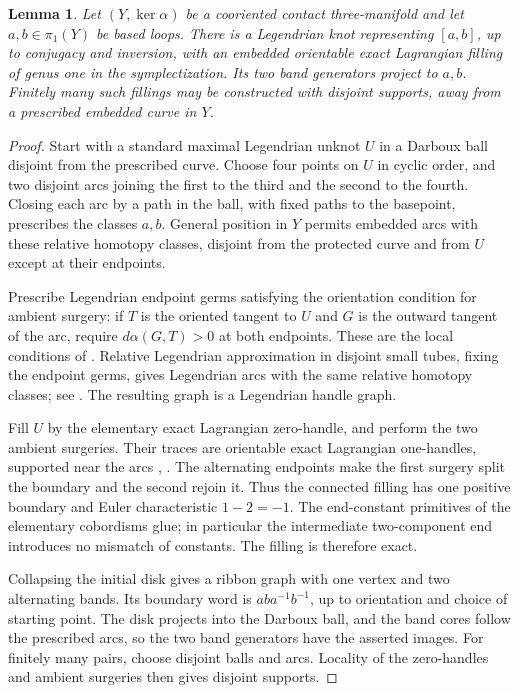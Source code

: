 \documentclass[11pt]{amsart}
\newtheorem{lemma}[theorem]{Lemma}
\theoremstyle{definition}
\theoremstyle{remark}
\begin{document}
\begin{lemma}\label{lem:commutator-filling}
Let $(Y,\ker\alpha)$ be a cooriented contact three-manifold and
let $a,b\in\pi_1(Y)$ be based loops. There is a Legendrian knot
representing $[a,b]$, up to conjugacy and inversion, with an embedded
orientable exact Lagrangian filling of genus one in the
symplectization. Its two band generators project to $a,b$.
Finitely many such fillings may be constructed with disjoint
supports, away from a prescribed embedded curve in $Y$.
\end{lemma}
\begin{proof}
Start with a standard maximal Legendrian unknot $U$ in a Darboux
ball disjoint from the prescribed curve. Choose four points on $U$
in cyclic order, and two disjoint arcs joining the first to the
third and the second to the fourth. Closing each arc by a path in
the ball, with fixed paths to the basepoint, prescribes the classes
$a,b$. General position in $Y$ permits embedded arcs with these
relative homotopy classes, disjoint from the protected curve and
from $U$ except at their endpoints.

Prescribe Legendrian endpoint germs satisfying the orientation
condition for ambient surgery: if $T$ is the oriented tangent to
$U$ and $G$ is the outward tangent of the arc, require
$d\alpha(G,T)>0$ at both endpoints. These are the local conditions
of \cite[Section 2.2]{SVW24}. Relative Legendrian approximation
in disjoint small tubes, fixing the endpoint germs, gives
Legendrian arcs with the same relative homotopy classes; see
\cite[Theorem 2.5 and its arc construction]{Etn05}.
The resulting graph is a Legendrian handle graph.

Fill $U$ by the elementary exact Lagrangian zero-handle, and
perform the two ambient surgeries. Their traces are orientable
exact Lagrangian one-handles, supported near the arcs
\cite[Section 4]{DR16}, \cite[Theorem 2.2]{SVW24}.
The alternating endpoints make the first surgery split the
boundary and the second rejoin it. Thus the connected filling has
one positive boundary and Euler characteristic $1-2=-1$.
The end-constant primitives of the elementary cobordisms glue;
in particular the intermediate two-component end introduces no
mismatch of constants. The filling is therefore exact.

Collapsing the initial disk gives a ribbon graph with one vertex
and two alternating bands. Its boundary word is
$aba^{-1}b^{-1}$, up to orientation and choice of starting point.
The disk projects into the Darboux ball, and the band cores follow
the prescribed arcs, so the two band generators have the asserted
images. For finitely many pairs, choose disjoint balls and arcs.
Locality of the zero-handles and ambient surgeries then gives
disjoint supports.
\end{proof}
\end{document}
